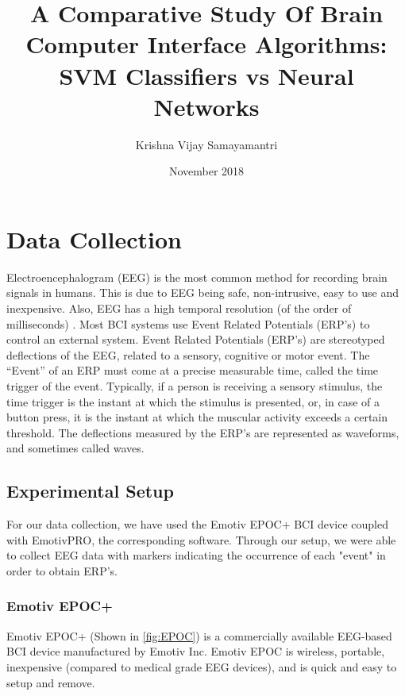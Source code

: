 \documentclass{article}
\title{A Comparative Study Of Brain Computer Interface Algorithms: SVM Classifiers vs Neural Networks}
\author{Krishna Vijay Samayamantri}
\date{November 2018}
\begin{document}
\maketitle

\newpage
\listoffigures 
\listoftables

\newpage
\section{Data Collection}
Electroencephalogram (EEG) is the most common method for recording brain signals in humans. This is due to EEG being safe, non-intrusive, easy to use and inexpensive. Also, EEG has a high temporal resolution (of the order of milliseconds)\cite{lotte:hal-01167515} \cite{niedermeyer2005electroencephalography}.
Most BCI systems use Event Related Potentials (ERP's) to control an external system. Event Related Potentials (ERP's) are stereotyped deflections of the EEG, related to a sensory, cognitive or motor event. The “Event” of an ERP must come at a precise measurable time, called the time trigger of the event. Typically, if a person is receiving a sensory stimulus, the time trigger is the instant at which the stimulus is presented, or, in case of a button press, it is the instant at which the muscular activity exceeds a certain threshold.
The deflections measured by the ERP's are represented as waveforms, and sometimes called waves.\cite{lotte:hal-01167515}

\subsection{Experimental Setup}
For our data collection, we have used the Emotiv EPOC+ BCI device coupled with EmotivPRO,  the corresponding software. Through our setup, we were able to collect EEG data with markers indicating the occurrence of each "event" in order to obtain ERP's. 

\subsubsection{Emotiv EPOC+}
Emotiv EPOC+ (Shown in \ref{fig:EPOC}) is a commercially available EEG-based BCI device manufactured by Emotiv Inc. Emotiv EPOC is wireless, portable, inexpensive (compared to medical grade EEG devices), and is quick and easy to setup and remove.\cite{EPOCUserManual:2018} 
\end{document}
